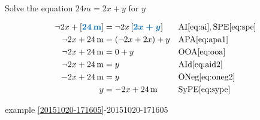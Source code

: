 \documentclass[20150903-160354-rs2.2-MarksMathNotebook.tex]{subfiles}
\begin{document}
\begin{example}[id:20151020-180416] \label{20151020-180416} \hfill \\
Solve the equation $24 \unit{m} = 2x + y$ for $y$

\soln

\solnsteps
\begin{align*}
\neg 2x + \farg{24 \unit{m}} &= \neg 2x \farg{2x+y} && \text{AI} \eqref{eq:ai},\text{SPE} \eqref{eq:spe}  \\
\neg 2x + 24 \unit{m} &= \left(\neg 2x + 2x\right) + y && \text{APA} \eqref{eq:apa1} \\
\neg 2x + 24 \unit{m} &= 0+y && \text{OOA} \eqref{eq:ooa} \\
\neg 2x + 24 \unit{m} &= y && \text{AId} \eqref{eq:aid2} \\
- 2x + 24 \unit{m} &= y && \text{ONeg} \eqref{eq:oneg2} \\
y &=  -2x + 24 \unit{m} && \text{SyPE} \eqref{eq:sype} 
\end{align*}

\qdepend

\qdependlist
example \ref{20151020-171605}-20151020-171605

\end{example}
\end{document}
